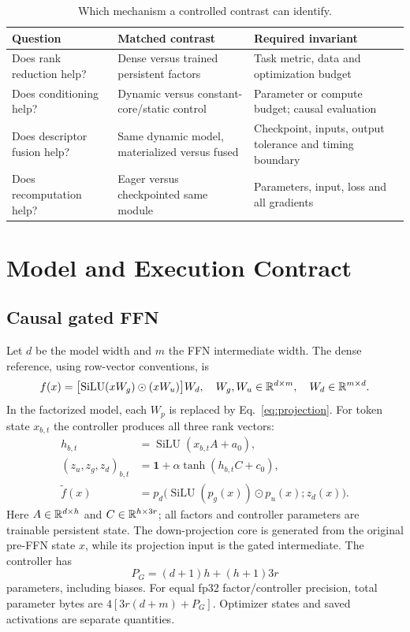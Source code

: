 \begin{table}[t]
\centering\small
\caption{Which mechanism a controlled contrast can identify.}
\label{tab:contrast-design}
\begin{tabular}{p{.22\linewidth}p{.34\linewidth}p{.34\linewidth}}
\toprule
Question & Matched contrast & Required invariant \\
\midrule
Does rank reduction help? & Dense versus trained persistent factors & Task metric, data and optimization budget \\
Does conditioning help? & Dynamic versus constant-core/static control & Parameter or compute budget; causal evaluation \\
Does descriptor fusion help? & Same dynamic model, materialized versus fused & Checkpoint, inputs, output tolerance and timing boundary \\
Does recomputation help? & Eager versus checkpointed same module & Parameters, input, loss and all gradients \\
\bottomrule
\end{tabular}
\end{table}

\section{Model and Execution Contract}
\subsection{Causal gated FFN}
Let $d$ be the model width and $m$ the FFN intermediate width. The dense
reference, using row-vector conventions, is
\begin{equation}
 f(x)=\bigl[\operatorname{SiLU}(xW_g)\odot(xW_u)\bigr]W_d,
 \quad W_g,W_u\in\mathbb{R}^{d\times m},\quad W_d\in\mathbb{R}^{m\times d}.
\end{equation}
In the factorized model, each $W_p$ is replaced by Eq.~\eqref{eq:projection}.
For token state $x_{b,t}$ the controller produces all three rank vectors:
\begin{align}
 h_{b,t}&=\operatorname{SiLU}(x_{b,t}A+a_0),\\
 (z_u,z_g,z_d)_{b,t}&=\mathbf 1+\alpha\tanh(h_{b,t}C+c_0),\label{eq:controller}\\
 \widetilde f(x)&=p_d\bigl(\operatorname{SiLU}(p_g(x))\odot p_u(x);z_d(x)\bigr).
 \label{eq:ffn}
\end{align}
Here $A\in\mathbb{R}^{d\times h}$ and $C\in\mathbb{R}^{h\times3r}$; all factors and
controller parameters are trainable persistent state. The down-projection
core is generated from the original pre-FFN state $x$, while its projection
input is the gated intermediate. The controller has
\begin{equation}
 P_G=(d+1)h+(h+1)3r\label{eq:controller-count}
\end{equation}
parameters, including biases. For equal fp32 factor/controller precision, total
parameter bytes are $4[3r(d+m)+P_G]$. Optimizer states and saved activations
are separate quantities.

